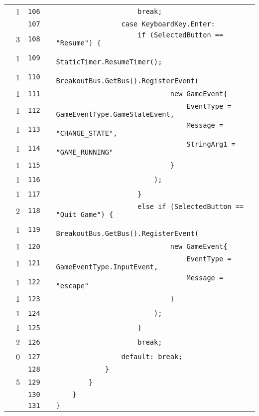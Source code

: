 \documentclass[a4paper,landscape,10pt]{article}
\begin{document}
\begin{longtable}[l]{lrrll}
\cellcolor{green} & 1 & \verb~106~ & & \verb~                    break;~\\
\cellcolor{gray} &  & \verb~107~ & & \verb~                case KeyboardKey.Enter:~\\
\cellcolor{green} & 3 & \verb~108~ & & \verb~                    if (SelectedButton == "Resume") {~\\
\cellcolor{green} & 1 & \verb~109~ & & \verb~                        StaticTimer.ResumeTimer();~\\
\cellcolor{green} & 1 & \verb~110~ & & \verb~                        BreakoutBus.GetBus().RegisterEvent(~\\
\cellcolor{green} & 1 & \verb~111~ & & \verb~                            new GameEvent{~\\
\cellcolor{green} & 1 & \verb~112~ & & \verb~                                EventType = GameEventType.GameStateEvent,~\\
\cellcolor{green} & 1 & \verb~113~ & & \verb~                                Message = "CHANGE_STATE",~\\
\cellcolor{green} & 1 & \verb~114~ & & \verb~                                StringArg1 = "GAME_RUNNING"~\\
\cellcolor{green} & 1 & \verb~115~ & & \verb~                            }~\\
\cellcolor{green} & 1 & \verb~116~ & & \verb~                        );~\\
\cellcolor{green} & 1 & \verb~117~ & & \verb~                    }~\\
\cellcolor{green} & 2 & \verb~118~ & & \verb~                    else if (SelectedButton == "Quit Game") {~\\
\cellcolor{green} & 1 & \verb~119~ & & \verb~                        BreakoutBus.GetBus().RegisterEvent(~\\
\cellcolor{green} & 1 & \verb~120~ & & \verb~                            new GameEvent{~\\
\cellcolor{green} & 1 & \verb~121~ & & \verb~                                EventType = GameEventType.InputEvent,~\\
\cellcolor{green} & 1 & \verb~122~ & & \verb~                                Message = "escape"~\\
\cellcolor{green} & 1 & \verb~123~ & & \verb~                            }~\\
\cellcolor{green} & 1 & \verb~124~ & & \verb~                        );~\\
\cellcolor{green} & 1 & \verb~125~ & & \verb~                    }~\\
\cellcolor{green} & 2 & \verb~126~ & & \verb~                    break;~\\
\cellcolor{red} & 0 & \verb~127~ & & \verb~                default: break;~\\
\cellcolor{gray} &  & \verb~128~ & & \verb~            }~\\
\cellcolor{green} & 5 & \verb~129~ & & \verb~        }~\\
\cellcolor{gray} &  & \verb~130~ & & \verb~    }~\\
\cellcolor{gray} &  & \verb~131~ & & \verb~}~\\
\end{longtable}
\newpage
\end{document}
